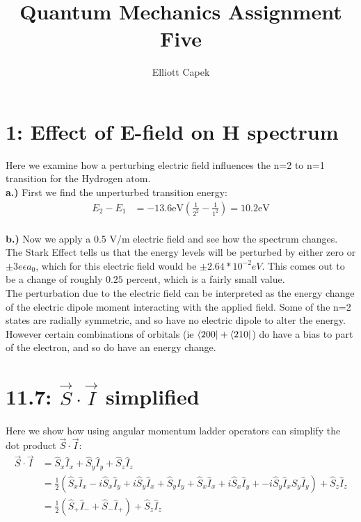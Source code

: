 \documentclass[10pt]{article} %
\title{Quantum Mechanics Assignment Five}
\author{Elliott Capek}
\begin{document}
\maketitle{}

\section{1: Effect of E-field on H spectrum}
Here we examine how a perturbing electric field influences the n=2 to n=1 transition for
the Hydrogen atom.\\

\textbf{a.)} First we find the unperturbed transition energy:\\

\begin{align*}
  E_2 - E_1 &= -13.6 \mbox{eV} \left(\frac{1}{2^2} - \frac{1}{1^2}\right) = 10.2 \mbox{eV}\\
\end{align*}

\textbf{b.)} Now we apply a 0.5 V/m electric field and see how the spectrum changes. The Stark
Effect tells us that the energy levels will be perturbed by either zero or
$\pm3e\epsilon a_0$, which for this electric field would be $\pm 2.64*10^{-2}eV$. This comes out
to be a change of roughly $0.25$ percent, which is a fairly small value.\\

The perturbation due to the electric field can be interpreted as the energy change of the
electric dipole moment interacting with the applied field. Some of the n=2 states are radially
symmetric, and so have no electric dipole to alter the energy. However certain combinations of
orbitals (ie $\bra{200}+\bra{210}$) do have a bias to part of the electron, and so do have an
energy change.\\

\section{11.7: $\vec{S} \cdot \vec{I}$ simplified}

Here we show how using angular momentum ladder operators can simplify the dot product
$\vec{S} \cdot \vec{I}$:\\

\begin{align*}
  \vec{S} \cdot \vec{I} &= \hat{S}_x\hat{I}_x + \hat{S}_y\hat{I}_y + \hat{S}_z\hat{I}_z\\
  &= \frac{1}{2}\left(\hat{S}_x\hat{I}_x -i\hat{S}_x\hat{I}_y + i\hat{S}_y\hat{I}_x
  + \hat{S}_y\hat{I}_y + \hat{S}_x\hat{I}_x + i\hat{S}_x\hat{I}_y
  + -i\hat{S}_y\hat{I}_x\hat{S}_y\hat{I}_y\right)
  + \hat{S}_z\hat{I}_z\\
  &= \frac{1}{2}\left(\hat{S}_+\hat{I}_- + \hat{S}_-\hat{I}_+\right) + \hat{S}_z\hat{I}_z\\
\end{align*}
\end{document}
